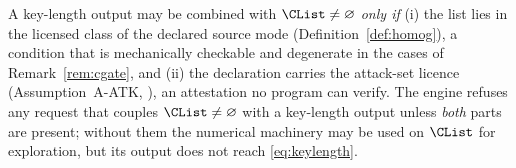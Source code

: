
\begin{requirement}\label{req:constrained-key-gate}
A key-length output may be combined with $\CList\neq\varnothing$
\emph{only if} (i) the list lies in the licensed class of the declared
source mode (Definition~\ref{def:homog}), a condition that is mechanically
checkable and degenerate in the cases of Remark~\ref{rem:cgate}, and
(ii) the declaration carries the attack-set licence
 (Assumption~A-ATK,
), an attestation no program can verify.
The engine refuses any request that couples $\CList\neq\varnothing$ with a
key-length output unless \emph{both} parts are present; without them the
numerical machinery may be used on $\CList$ for exploration, but its output
does not reach \eqref{eq:keylength}.
\end{requirement}
